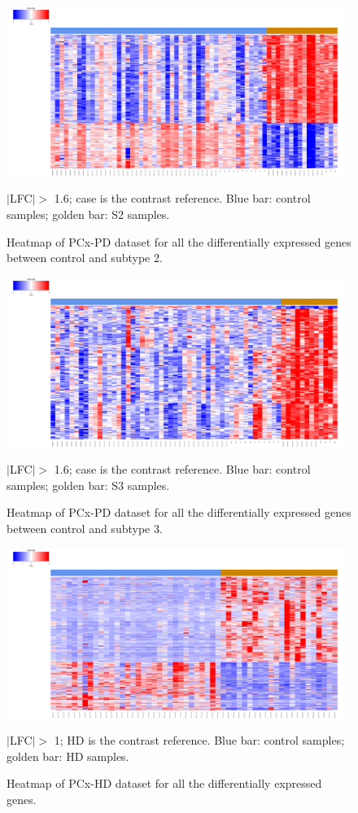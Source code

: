\begin{figure}[!ht]
    \centerline{\includegraphics[width = 11cm]{Figures/DE heatmap/CTLvs2_PD-PCx_all.png}}
\caption{Heatmap of PCx-PD dataset for all the differentially expressed genes between control and subtype 2.}
\footnotesize $|$LFC$| >$ 1.6; case is the contrast reference. Blue bar: control samples; golden bar: S2 samples.
\end{figure}

\begin{figure}[!ht]
    \centerline{\includegraphics[width = 11cm]{Figures/DE heatmap/CTLvs3_PD-PCx_all.png}}
\caption{Heatmap of PCx-PD dataset for all the differentially expressed genes between control and subtype 3.}
\footnotesize $|$LFC$| >$ 1.6; case is the contrast reference. Blue bar: control samples; golden bar: S3 samples.
\end{figure}


\begin{figure}[!ht]
    \centerline{\includegraphics[width = 11cm]{Figures/DE heatmap/CTLvsHD-PCx_all.png}}
\caption{Heatmap of PCx-HD dataset for all the differentially expressed genes.}
\label{DE-pcx-hd}
\footnotesize $|$LFC$| >$ 1; HD is the contrast reference. Blue bar: control samples; golden bar: HD samples.
\end{figure}

